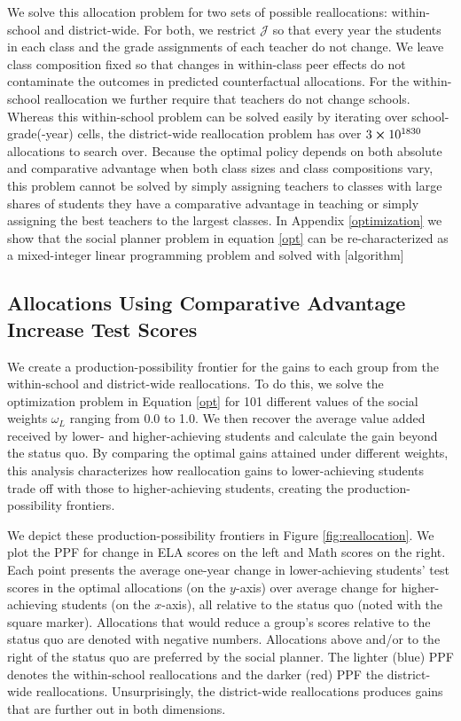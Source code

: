 \documentclass[12pt]{article}
\theoremstyle{definition}
\theoremstyle{definition}
\theoremstyle{definition}
\theoremstyle{definition}
\begin{document}
We solve this allocation problem for two sets of possible reallocations: within-school and district-wide. For both, we restrict $\mathscr{J}$ so that every year the students in each class and the grade assignments of each teacher do not change. We leave class composition fixed so that changes in within-class peer effects do not contaminate the outcomes in predicted counterfactual allocations. For the within-school reallocation we further require that teachers do not change schools.  Whereas this within-school problem can be solved easily by iterating over school-grade(-year) cells, the district-wide reallocation problem has over $3\cross 10^{1830}$ allocations to search over. Because the optimal policy depends on both absolute and comparative advantage when both class sizes and class compositions vary, this problem cannot be solved by simply assigning teachers to classes with large shares of students they have a comparative advantage in teaching or simply assigning the best teachers to the largest classes. In Appendix \ref{optimization} we show that the social planner problem in equation \ref{opt} can be re-characterized as a mixed-integer linear programming problem and solved with [algorithm] \citep{?}



\subsection{Allocations Using Comparative Advantage Increase Test Scores}

We create a production-possibility frontier for the gains to each group from the within-school and district-wide reallocations. To do this, we solve the optimization problem in Equation \ref{opt} for 101 different values of the social weights $\omega_L$ ranging from 0.0 to 1.0. We then recover the average value added received by lower- and higher-achieving students and calculate the gain beyond the status quo. By comparing the optimal gains attained under different weights, this analysis characterizes how reallocation gains to lower-achieving students trade off with those to higher-achieving students, creating the production-possibility frontiers.

We depict these production-possibility frontiers in Figure \ref{fig:reallocation}. We plot the PPF for change in  ELA scores on the left and Math scores on the right. Each point presents the average one-year change in lower-achieving students' test scores in the optimal allocations (on the $y$-axis) over average change for higher-achieving students (on the $x$-axis), all relative to the status quo (noted with the square marker). Allocations that would reduce a group's scores relative to the status quo are denoted with negative numbers. Allocations above and/or to the right of the status quo are preferred by the social planner. The lighter (blue) PPF denotes the within-school reallocations and the darker (red) PPF the district-wide reallocations. Unsurprisingly, the district-wide reallocations produces gains that are further out in both dimensions.
\end{document}
